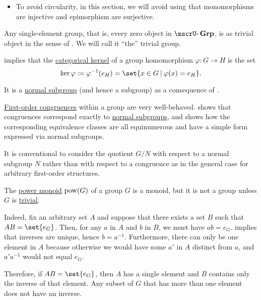 \begin{definition}
\begin{thmenum}
\begin{itemize}
      \item To avoid circularity, in this section, we will avoid using that monomorphisms are injective and epimorphism are surjective.
    \end{itemize}

     Any single-element group, that is, every zero object in \( \ucat{Grp} \), is as trivial object in the sense of . We will call it \enquote{the} trivial group.

      implies that the \hyperref[def:zero_morphisms/kernel]{categorical kernel} of a group homomorphism \( \varphi: G \to H \) is the set
    \begin{equation*}
      \ker \varphi \coloneqq \varphi^{-1}(e_H) = \set{ x \in G \given \varphi(x) = e_H }.
    \end{equation*}

    It is a \hyperref[def:normal_subgroup]{normal subgroup} (and hence a subgroup) as a consequence of .

     \hyperref[def:first_order_congruence]{First-order congruences} within a group are very well-behaved.  shows that congruences correspond exactly to \hyperref[def:normal_subgroup]{normal subgroups}, and  shows how the corresponding equivalence classes are all equinumerous and have a simple form expressed via normal subgroups.

    It is conventional to consider the quotient \( G / N \) with respect to a normal subgroup \( N \) rather than with respect to a congruence as in the general case for arbitrary first-order structures.
  \end{thmenum}
\end{definition}

\begin{example}\label{ex:power_set_is_not_a_group}
  The \hyperref[ex:def:monoid/power]{power monoid} \( \operatorname{pow}(G) \) of a group \( G \) is a monoid, but it is not a group unless \( G \) is \hyperref[def:group/trivial]{trivial}.

  Indeed, fix an arbitrary set \( A \) and suppose that there exists a set \( B \) such that \( AB = \set{ e_G } \). Then, for any \( a \) in \( A \) and \( b \) in \( B \), we must have \( ab = e_G \).  implies that inverses are unique, hence \( b = a^{-1} \). Furthermore, there can only be one element in \( A \) because otherwise we would have some \( a' \) in \( A \) distinct from \( a \), and \( a' a^{-1} \) would not equal \( e_G \).

  Therefore, if \( AB = \set{ e_G } \), then \( A \) has a single element and \( B \) contains only the inverse of that element. Any subset of \( G \) that has more than one element does not have an inverse.
\end{example}

